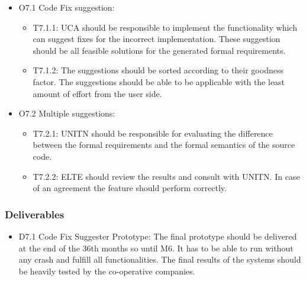 \begin{itemize}
	\item O7.1 Code Fix suggestion:
	\begin{itemize}
		\item T7.1.1: \gls{UCA} should be responsible to implement the functionality which can suggest fixes for the incorrect implementation. These suggestion should be all feasible solutions for the generated formal requirements.
		\item T7.1.2: The suggestions should be sorted according to their goodness factor. The suggestions should be able to be applicable with the least amount of effort from the user side.
	\end{itemize}
	\item O7.2 Multiple suggestions:
	\begin{itemize}
		\item T7.2.1: \gls{UNITN} should be responsible for evaluating the difference between the formal requirements and the formal semantics of the source code.
		\item T7.2.2: \gls{ELTE} should review the results and consult with \gls{UNITN}. In case of an agreement the feature should perform correctly.   
	\end{itemize}  
\end{itemize}

\subsubsection{Deliverables}
\begin{itemize}
	\item D7.1 Code Fix Suggester Prototype: The final prototype should be delivered at the end of the 36th months so until M6. It has to be able to run without any crash and fulfill all functionalities. The final results of the systems should be heavily tested by the co-operative companies.
\end{itemize}